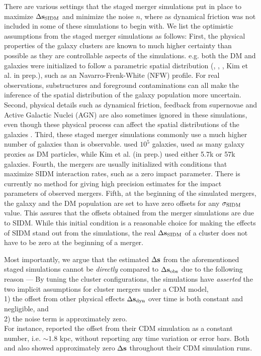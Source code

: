 There are various settings that the staged merger simulations put in place to maximize
$\Delta {\bf s}_{{\rm SIDM}}$ and minimize the noise $n$, where as  
dynamical friction was not included in some of these
simulations to begin with. 
We list the optimistic assumptions from the staged merger simulations as follows: 
First, the physical properties of the galaxy
clusters are known to much higher certainty than possible as they are
controllable aspects of the simulations. e.g. both the DM and 
galaxies were initialized to follow a parametric spatial 
distribution   
(\citealt{Randall2008d}, \citealt{Kahlhoefer14}, \citealt{Robertson2016}, Kim
et al. in prep.), 
such as an Navarro-Frenk-White (NFW) profile. For real observations,
substructures and foreground
contaminations can all make the inference of the spatial distribution 
of the galaxy population more uncertain. 
Second, physical details such as dynamical friction, feedback from supernovae and Active
Galactic Nuclei (AGN) are also sometimes ignored in these simulations, 
even though these physical process can affect the spatial distributions of the
galaxies \citep{Cui2015}.  
Third, these staged merger simulations commonly use a much higher number of 
galaxies than is observable. \cite{Randall2008d} used
$10^5$ galaxies, \cite{Kahlhoefer14} used as many galaxy proxies as DM particles, 
while Kim et al. (in prep.) used either 5.7k or 57k galaxies. 
Fourth, the mergers are usually initialized with conditions that maximize SIDM
interaction rates, such as a zero impact parameter. There is currently no
method for giving high precision estimates for the impact parameters of observed mergers. 
Fifth, at the beginning of the simulated mergers, the galaxy and the DM
population are set to have zero offsets for any $\sigma_{\rm SIDM}$ value. 
This assures that the offsets obtained from the merger simulations are due to SIDM. 
While this initial condition 
is a reasonable choice for making the effects of SIDM stand out from the simulations, 
the real $\Delta {\bf s}_{{\rm SIDM}}$ of a cluster does not have to be zero at the beginning of a merger.  

Most importantly, we argue that the estimated $\Delta {\bf s}$ 
from the aforementioned staged simulations cannot be
{\it directly}
compared to $\Delta {\bf s}_{\rm obs}$ due to the following reason --- 
By tuning the cluster configurations, the simulations have {\it asserted}
the two implicit assumptions for cluster mergers under a CDM model, \\
1) the offset from other physical effects $\Delta {\bf s}_{\rm dyn}$ over time 
is both constant and negligible, 
and \\ 
2) the noise term is approximately zero.\\ 
For instance, \cite{Randall2008d} reported the offset from their CDM simulation 
as a constant number, i.e. $\sim 1.8$ kpc, without reporting any time variation or error bars. 
Both \cite{Robertson2016} and
\cite{Kahlhoefer14} also showed approximately zero $\Delta {\bf s}$ throughout their CDM 
simulation runs.   

